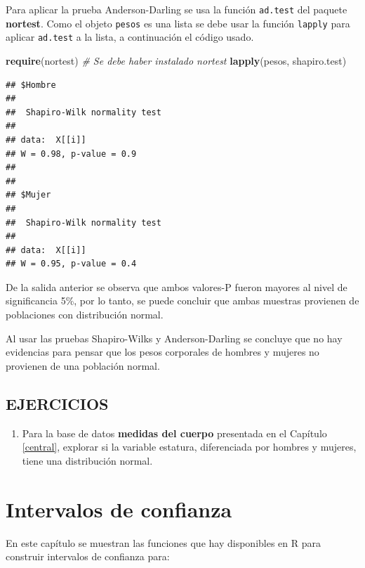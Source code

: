 \documentclass[10pt,]{krantz}
\makeatletter
\newenvironment{Shaded}{\begin{snugshade}}{\end{snugshade}}
\newcommand{\KeywordTok}[1]{\textcolor[rgb]{0.13,0.29,0.53}{\textbf{{#1}}}}
\newcommand{\CommentTok}[1]{\textcolor[rgb]{0.56,0.35,0.01}{\textit{{#1}}}}
\newcommand{\NormalTok}[1]{{#1}}
\providecommand{\tightlist}{%
  \setlength{\itemsep}{0pt}\setlength{\parskip}{0pt}}
\let\proglang=\textsf
\newenvironment{kframe}{%
\medskip{}
\setlength{\fboxsep}{.8em}
 \def\at@end@of@kframe{}%
 \ifinner\ifhmode%
  \def\at@end@of@kframe{\end{minipage}}%
  \begin{minipage}{\columnwidth}%
 \fi\fi%
 \def\FrameCommand##1{\hskip\@totalleftmargin \hskip-\fboxsep
 \colorbox{shadecolor}{##1}\hskip-\fboxsep
     \hskip-\linewidth \hskip-\@totalleftmargin \hskip\columnwidth}%
 \MakeFramed {\advance\hsize-\width
   \@totalleftmargin\z@ \linewidth\hsize
   \@setminipage}}%
 {\par\unskip\endMakeFramed%
 \at@end@of@kframe}
\renewenvironment{Shaded}{\begin{kframe}}{\end{kframe}}
\makeatother
\begin{document}
Para aplicar la prueba Anderson-Darling se usa la función
\texttt{ad.test} del paquete \textbf{nortest}. Como el objeto
\texttt{pesos} es una lista se debe usar la función \texttt{lapply} para
aplicar \texttt{ad.test} a la lista, a continuación el código usado.

\begin{Shaded}
\begin{Highlighting}[]
\KeywordTok{require}\NormalTok{(nortest) }\CommentTok{# Se debe haber instalado nortest}
\KeywordTok{lapply}\NormalTok{(pesos, shapiro.test)}
\end{Highlighting}
\end{Shaded}

\begin{verbatim}
## $Hombre
## 
##  Shapiro-Wilk normality test
## 
## data:  X[[i]]
## W = 0.98, p-value = 0.9
## 
## 
## $Mujer
## 
##  Shapiro-Wilk normality test
## 
## data:  X[[i]]
## W = 0.95, p-value = 0.4
\end{verbatim}

De la salida anterior se observa que ambos valores-P fueron mayores al
nivel de significancia 5\%, por lo tanto, se puede concluir que ambas
muestras provienen de poblaciones con distribución normal.

Al usar las pruebas Shapiro-Wilks y Anderson-Darling se concluye que no
hay evidencias para pensar que los pesos corporales de hombres y mujeres
no provienen de una población normal.

\section*{EJERCICIOS}\label{ejercicios-7}


\begin{enumerate}
\def\labelenumi{\arabic{enumi}.}
\tightlist
\item
  Para la base de datos \textbf{medidas del cuerpo} presentada en el
  Capítulo \ref{central}, explorar si la variable estatura, diferenciada
  por hombres y mujeres, tiene una distribución normal.
\end{enumerate}

\chapter{Intervalos de confianza}\label{intervalos-de-confianza}

En este capítulo se muestran las funciones que hay disponibles en
\proglang{R} para construir intervalos de confianza para:
\end{document}
